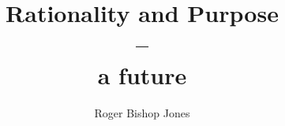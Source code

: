 \usepackage[T1]{fontenc}
\usepackage{textcomp}
\renewcommand{\rmdefault}{ppl}
\linespread{1.04}

\makeatletter
\def\cleardoublepage{\clearpage\if@twoside \ifodd\c@page\else
\hbox{}
\vspace*{\fill}
\begin{center}
\end{center}
\vspace{\fill}
\thispagestyle{empty}
\newpage
\if@twocolumn\hbox{}\newpage\fi\fi\fi}
\makeatother

\usepackage{fancyhdr}
\pagestyle{fancyplain}

\usepackage[twoside,paperwidth=5in,paperheight=8in,hmargin={0.75in,0.5in},vmargin={0.5in,0.5in},includehead,includefoot]{geometry}
\usepackage{tocloft}
\usepackage{tocbibind}
\makeindex
\newcommand{\indexentry}[2]{\item #1 #2}
\newcommand{\ignore}[1]{}

\fancyhfoffset[EL,RO]{0pt}
\newcommand{\aref}{}
\newcommand{\bookname}{}
\renewcommand{\chaptermark}[1]{\markboth{#1}{}}
\renewcommand{\sectionmark}[1]{\markright{#1}}
\lhead[\fancyplain{}{\thepage}]         {\fancyplain{}{}}
\chead[\fancyplain{}{\slshape\leftmark}]                 {\fancyplain{}{\slshape\rightmark}}
\rhead[\fancyplain{}{}]       {\fancyplain{}{\thepage}}
\lfoot[\fancyplain{}{\aref}]            {\fancyplain{}{}}
\cfoot[\fancyplain{}{}]                 {\fancyplain{}{}}
\rfoot[\fancyplain{}{}]                 {\fancyplain{}{\aref}}

\renewcommand{\headrulewidth}{0pt}

\title{Rationality and Purpose \\ -- \\ a future}
\author{Roger Bishop Jones}
\date{\ }


\frontmatter

